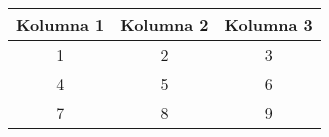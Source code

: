 \begin{table}[H]
    \centering
    \begin{tabular}{|c|c|c|}
        \hline
        Kolumna 1 & Kolumna 2 & Kolumna 3 \\
        \hline
        1 & 2 & 3 \\
        4 & 5 & 6 \\
        7 & 8 & 9 \\
        \hline
    \end{tabular}
    \label{tab:przykladowa}
    
\end{table}
